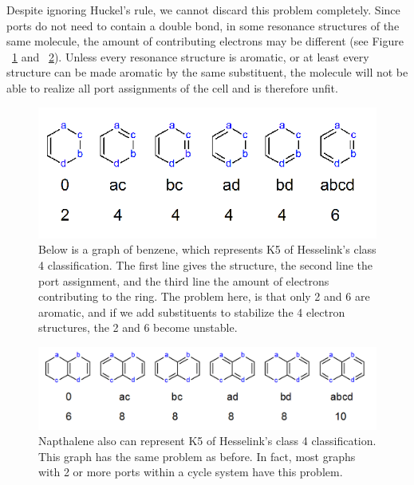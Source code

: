 \documentclass[12pt]{article}
\begin{document}
Despite ignoring Huckel's rule, we cannot discard this problem completely. Since ports do not need to contain a double bond, in some resonance structures of the same molecule, the amount of contributing electrons may be different (see Figure ~\ref{fig:badBenzene} and ~\ref{fig:badNapthalene}). Unless every resonance structure is aromatic, or at least every structure can be made aromatic by the same substituent, the molecule will not be able to realize all port assignments of the cell and is therefore unfit.  

\begin{figure}[ht!]
\centering
\includegraphics[width=130mm]{noSenseBenzene.png}
\caption{Below is a graph of benzene, which represents K5 of Hesselink's class 4 classification. The first line gives the structure, the second line the port assignment, and the third line the amount of electrons contributing to the ring. The problem here, is that only 2 and 6 are aromatic, and if we add substituents to stabilize the 4 electron structures, the 2 and 6 become unstable. }
\label{fig:badBenzene}
\end{figure}

\begin{figure}[ht!]
\centering
\includegraphics[width=150mm]{noSenseNapthalene.png}
\caption{Napthalene also can represent K5 of Hesselink's class 4 classification. This graph has the same problem as before. In fact, most graphs with 2 or more ports within a cycle system have this problem.}
\label{fig:badNapthalene}
\end{figure}
\end{document}

